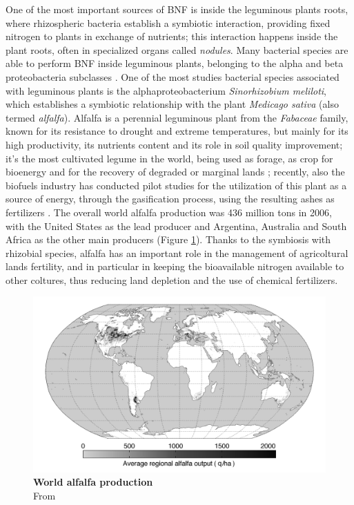 One of the most important sources of BNF is inside the leguminous plants roots, where rhizospheric bacteria establish a symbiotic interaction, providing fixed nitrogen to plants in exchange of nutrients; this interaction happens inside the plant roots, often in specialized organs called \textit{nodules}. Many bacterial species are able to perform BNF inside leguminous plants, belonging to the alpha and beta proteobacteria subclasses \cite{chen2003legume}. One of the most studies bacterial species associated with leguminous plants is the alphaproteobacterium \textit{Sinorhizobium meliloti}, which establishes a symbiotic relationship with the plant \textit{Medicago sativa} (also termed \textit{alfalfa}). Alfalfa is a perennial leguminous plant from the \textit{Fabaceae} family, known for its resistance to drought and extreme temperatures, but mainly for its high productivity, its nutrients content and its role in soil quality improvement; it's the most cultivated legume in the world, being used as forage, as crop for bioenergy and for the recovery of degraded or marginal lands \cite{vance2001application}\cite{ane2007recent}\cite{bouton1996new}\cite{comisalfalfa}; recently, also the biofuels industry has conducted pilot studies for the utilization of this plant as a source of energy, through the gasification process, using the resulting ashes as fertilizers \cite{mozaffari2000corn}\cite{mccaslin2007future}. The overall world alfalfa production was 436 million tons in 2006, with the United States as the lead producer and Argentina, Australia and South Africa as the other main producers \cite{alfalfa} (Figure \ref{fig:alfalfa}). Thanks to the symbiosis with rhizobial species, alfalfa has an important role in the management of agricoltural lands fertility, and in particular in keeping the bioavailable nitrogen available to other coltures, thus reducing land depletion and the use of chemical fertilizers.

\begin{figure}[!tb]
	\center
    \includegraphics[width=1\textwidth]{figures/Introduction/thesis_16}
	\caption{\label{fig:alfalfa}\textbf{World alfalfa production}\\
			From \cite{alfalfa}}
\end{figure}


